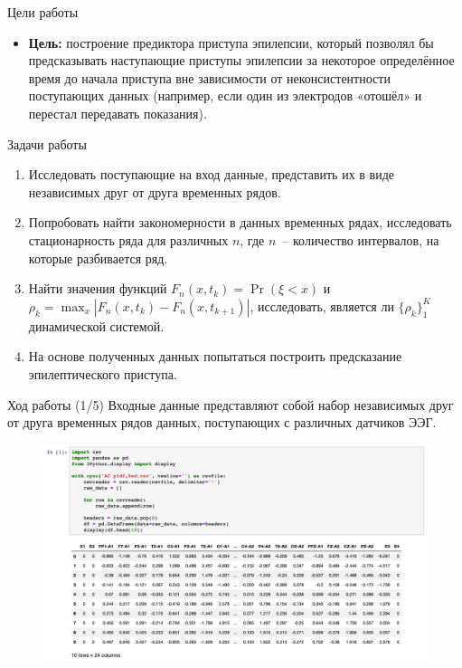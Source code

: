\documentclass[aspectratio=169]{beamer}
\begin{document}
\begin{frame}{Цели работы}
  \begin{itemize}
  \item {
    \textbf{Цель:} построение предиктора приступа эпилепсии, который позволял бы предсказывать наступающие приступы эпилепсии за некоторое определённое время до начала приступа вне зависимости от неконсистентности поступающих данных (например, если один из электродов «отошёл» и перестал передавать показания).
  }
  \end{itemize}
\end{frame}

\begin{frame}{Задачи работы}
  \begin{enumerate}
    \item Исследовать поступающие на вход данные, представить их в виде независимых друг от друга временных рядов.
    \item Попробовать найти закономерности в данных временных рядах, исследовать стационарность ряда для различных $n$, где $n$~-- количество интервалов, на которые разбивается ряд.
    \item Найти значения функций $F_n(x, t_k) = \Pr{(\xi < x)}$ и $\rho_k = \max_x{|F_n(x, t_k) - F_n(x, t_{k+1})|}$, исследовать, является ли $\{\rho_k\}_1^K$ динамической системой.
    \item На основе полученных данных попытаться построить предсказание эпилептического приступа.
  \end{enumerate}
\end{frame}

\begin{frame}{Ход работы (1/5)}
  Входные данные представляют собой набор независимых друг от друга временных рядов данных, поступающих с различных датчиков ЭЭГ.
  \begin{figure}[h!]
    \centering
    \includegraphics[scale=0.23]{1.png}
  \end{figure}
\end{frame}
\end{document}
